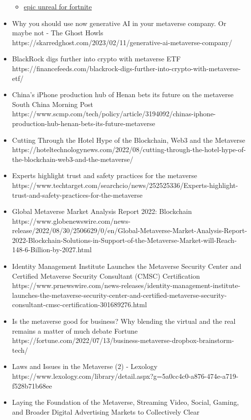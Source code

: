 \begin{itemize}
\begin{itemize}
  \item
    \href{https://store.epicgames.com/en-US/p/fortnite--uefn?}{epic
    unreal for fortnite}
  \end{itemize}
\item
  Why you should use now generative AI in your metaverse company. Or
  maybe not - The Ghost Howls
  https://skarredghost.com/2023/02/11/generative-ai-metaverse-company/
\item
  BlackRock digs further into crypto with metaverse ETF
  https://financefeeds.com/blackrock-digs-further-into-crypto-with-metaverse-etf/
\item
  China's iPhone production hub of Henan bets its future on the
  metaverse \textbar{} South China Morning Post
  https://www.scmp.com/tech/policy/article/3194092/chinas-iphone-production-hub-henan-bets-its-future-metaverse
\item
  Cutting Through the Hotel Hype of the Blockchain, Web3 and the
  Metaverse \textbar{}
  https://hoteltechnologynews.com/2022/08/cutting-through-the-hotel-hype-of-the-blockchain-web3-and-the-metaverse/
\item
  Experts highlight trust and safety practices for the metaverse
  https://www.techtarget.com/searchcio/news/252525336/Experts-highlight-trust-and-safety-practices-for-the-metaverse
\item
  Global Metaverse Market Analysis Report 2022: Blockchain
  https://www.globenewswire.com/news-release/2022/08/30/2506629/0/en/Global-Metaverse-Market-Analysis-Report-2022-Blockchain-Solutions-in-Support-of-the-Metaverse-Market-will-Reach-148-6-Billion-by-2027.html
\item
  Identity Management Institute Launches the Metaverse Security Center
  and Certified Metaverse Security Consultant (CMSC)  Certification
  https://www.prnewswire.com/news-releases/identity-management-institute-launches-the-metaverse-security-center-and-certified-metaverse-security-consultant-cmsc-certification-301689276.html
\item
  Is the metaverse good for business? Why blending the virtual and the
  real remains a matter of much debate \textbar{} Fortune
  https://fortune.com/2022/07/13/business-metaverse-dropbox-brainstorm-tech/
\item
  Laws and Issues in the Metaverse (2) - Lexology
  https://www.lexology.com/library/detail.aspx?g=5a0cc4c0-a876-474e-a719-f528b71b68ee
\item
  Laying the Foundation of the Metaverse, Streaming Video, Social,
  Gaming, and Broader Digital Advertising Markets to Collectively Clear

\end{itemize}
